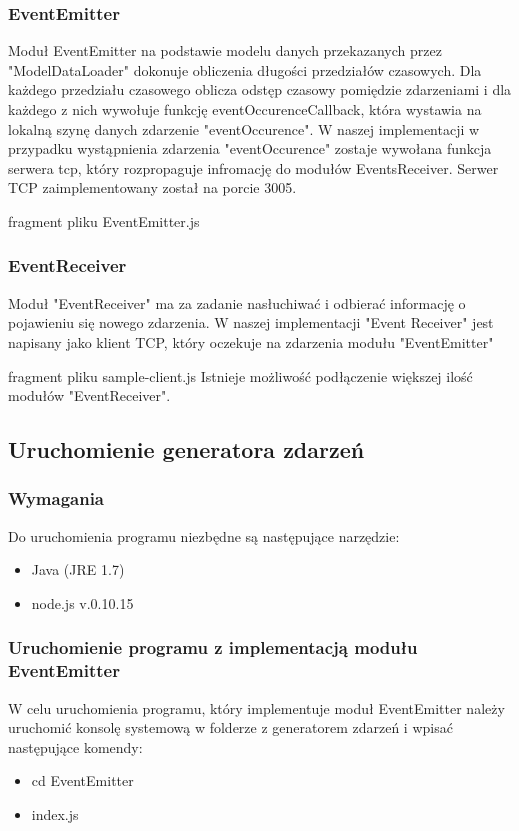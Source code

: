 \subsubsection{EventEmitter}
Moduł EventEmitter na podstawie modelu danych przekazanych przez "ModelDataLoader" dokonuje obliczenia długości przedziałów czasowych. Dla każdego przedziału czasowego oblicza odstęp czasowy pomiędzie zdarzeniami i dla każdego z nich wywołuje funkcję eventOccurenceCallback, która wystawia na lokalną szynę danych zdarzenie "eventOccurence". W naszej implementacji w przypadku wystąpnienia zdarzenia "eventOccurence" zostaje wywołana funkcja serwera tcp, który rozpropaguje infromację do modułów EventsReceiver. Serwer TCP zaimplementowany został na porcie 3005.

fragment pliku EventEmitter.js

\subsubsection{EventReceiver}
Moduł "EventReceiver" ma za zadanie nasłuchiwać i odbierać informację o pojawieniu się nowego zdarzenia. W naszej implementacji "Event Receiver" jest napisany jako klient TCP, który oczekuje na zdarzenia modułu "EventEmitter"

fragment pliku sample-client.js
Istnieje możliwość podłączenie większej ilość modułów "EventReceiver".


\subsection{Uruchomienie generatora zdarzeń}
\subsubsection{Wymagania}
Do uruchomienia programu niezbędne są następujące narzędzie:
\begin{itemize}[noitemsep]
  \item Java (JRE 1.7)
  \item node.js v.0.10.15
\end{itemize}
\subsubsection{Uruchomienie programu z implementacją modułu EventEmitter}
W celu uruchomienia programu, który implementuje moduł EventEmitter należy uruchomić konsolę systemową w folderze z generatorem zdarzeń i wpisać następujące komendy:
\begin{itemize}[noitemsep]
  \item cd EventEmitter
  \item index.js
\end{itemize}
